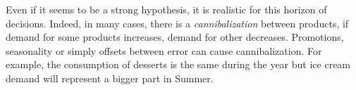 Even if it seems to be a strong hypothesis, it is realistic for this horizon of decisions.
Indeed, in many cases, there is a \emph{cannibalization} between products, \ie if demand for some products increases, demand for other decreases.
Promotions, seasonality or simply offsets between error can cause cannibalization.
For example, the consumption of desserts is the same during the year but ice cream demand will represent a bigger part in Summer.


